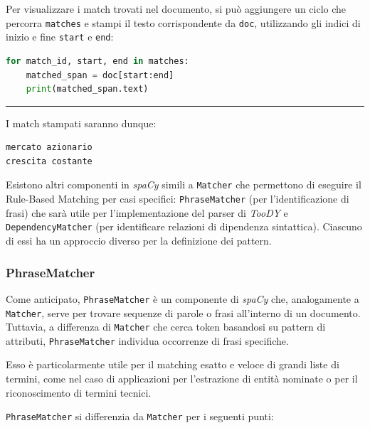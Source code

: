 \documentclass[12pt]{report}
\newcommand{\toody}{\textsl{TooDY}\xspace}
\newcommand{\spacy}{\textsl{spaCy}\xspace}
\begin{document}
\begin{mdframed}
\small
Per visualizzare i match trovati nel documento, si può aggiungere un ciclo che percorra \texttt{matches} e stampi il testo corrispondente da \texttt{doc}, utilizzando gli indici di inizio e fine \texttt{start} e \texttt{end}:

\begin{lstlisting}[language=Python]
for match_id, start, end in matches:
    matched_span = doc[start:end]
    print(matched_span.text)
\end{lstlisting}

{\centering \rule{0.5\linewidth}{0.1pt} \par\vspace{0.25cm}}

\noindent I match stampati saranno dunque:

\begin{lstlisting}
mercato azionario
crescita costante
\end{lstlisting}
\end{mdframed}

Esistono altri componenti in \spacy simili a \texttt{Matcher} che permettono di eseguire il Rule-Based Matching per casi specifici: \texttt{PhraseMatcher} (per l'identificazione di frasi) che sarà utile per l'implementazione del parser di \toody e \texttt{DependencyMatcher} (per identificare relazioni di dipendenza sintattica). Ciascuno di essi ha un approccio diverso per la definizione dei pattern.


\subsubsection{PhraseMatcher}
Come anticipato, \texttt{PhraseMatcher} è un componente di \spacy che, analogamente a \texttt{Matcher}, serve per trovare sequenze di parole o frasi all'interno di un documento. Tuttavia, a differenza di \texttt{Matcher} che cerca token basandosi su pattern di attributi, \texttt{PhraseMatcher} individua occorrenze di frasi specifiche.

Esso è particolarmente utile per il matching esatto e veloce di grandi liste di termini, come nel caso di applicazioni per l'estrazione di entità nominate o per il riconoscimento di termini tecnici.

\texttt{PhraseMatcher} si differenzia da \texttt{Matcher} per i seguenti punti:
\end{document}
